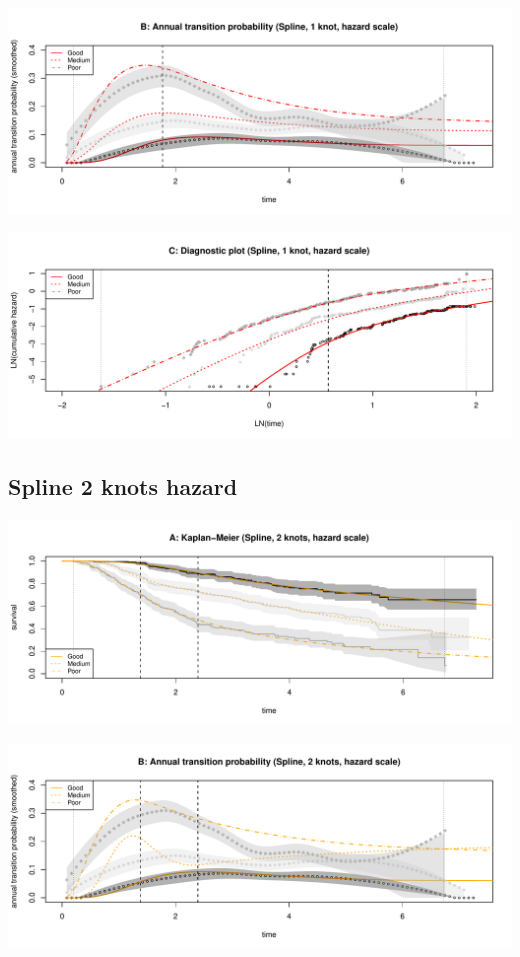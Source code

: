 \documentclass[
]{article}
\begin{document}
\begin{flushleft}\includegraphics[height=0.25\textheight]{Images/spline_hazard1-2} \end{flushleft}

\begin{flushleft}\includegraphics[height=0.25\textheight]{Images/spline_hazard1-3} \end{flushleft}

\hypertarget{spline-2-knots-hazard}{%
\subsection{Spline 2 knots hazard}\label{spline-2-knots-hazard}}

\begin{flushleft}\includegraphics[height=0.25\textheight]{Images/spline_hazard2-1} \end{flushleft}

\begin{flushleft}\includegraphics[height=0.25\textheight]{Images/spline_hazard2-2} \end{flushleft}
\end{document}
